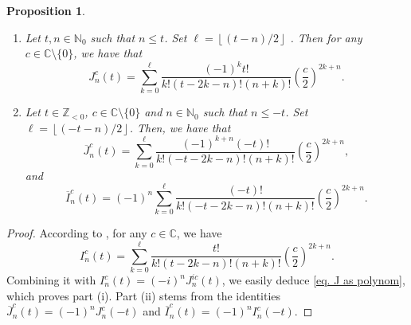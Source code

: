 \documentclass[12pt]{amsart}
\numberwithin{equation}{section}
\newtheorem{proposition}[theorem]{Proposition}
\begin{document}
\begin{proposition}
\label{propJ}\hfill
\begin{enumerate}[label=\normalfont(\roman*)]
\item Let $t,n\in \mathbb{N}_{0}$ such that $n\leq t$. Set $\ell
=\left\lfloor \left( t-n\right) /2\right\rfloor $ . Then for any $c\in%
\mathbb{C}\setminus\{0\}$, we have that
\begin{equation}\label{eq. J as polynom}
J_{n}^{c}\left( t\right) =\sum\limits_{k=0}^{\ell }\frac{\left( -1\right)
^{k}t!}{k!\left( t-2k-n\right) !\left( n+k\right) !}\left( \frac{c}{2}%
\right) ^{2k+n}.
\end{equation}

\item Let $t\in\mathbb{Z}_{<0}$, $c\in\mathbb{C}\setminus\{0\}$ and $n\in \mathbb{N}_{0}$ such that $n\leq -t$.
Set $\ell =\left\lfloor \left( -t-n\right) /2\right\rfloor$. Then, we have that
\begin{equation*}
\overline{J}_{n}^{c}\left( t\right) =\sum\limits_{k=0}^{\ell }\frac{\left(
-1\right) ^{k+n}\left( -t\right) !}{k!\left( -t-2k-n\right) !\left(
n+k\right) !}\left( \frac{c}{2}\right) ^{2k+n},
\end{equation*}
and
\begin{equation*}
\overline{I}_{n}^{c}\left( t\right) =(-1)^n \sum\limits_{k=0}^{\ell }\frac{\left( -t\right) !}{k!\left( -t-2k-n\right) !\left(
n+k\right) !}\left( \frac{c}{2}\right) ^{2k+n}.
\end{equation*}
\end{enumerate}
\end{proposition}
\begin{proof}
According to \cite[Proposition 3.2.]{CHJSV}, for any $c\in \mathbb{C} $, we
have
\begin{equation*}
I_{n}^{c}\left( t\right) =\sum\limits_{k=0}^{\ell }\frac{t!}{k!\left(
t-2k-n\right) !\left( n+k\right) !}\left( \frac{c}{2}\right) ^{2k+n}.
\end{equation*}
Combining it with $I_{n}^{c}\left( t\right) =\left( -i\right)
^{n}J_{n}^{ic}\left( t\right) $, we easily deduce \eqref{eq. J as polynom}, which proves part (i). Part (ii) stems from the identities $\overline{J}
_{n}^{c}\left( t\right) =\left( -1\right) ^{n}J_{n}^{c}\left( -t\right) $  and $\overline{I}
_{n}^{c}\left( t\right) =\left( -1\right) ^{n}I_{n}^{c}\left( -t\right) $.
\end{proof}
\end{document}
